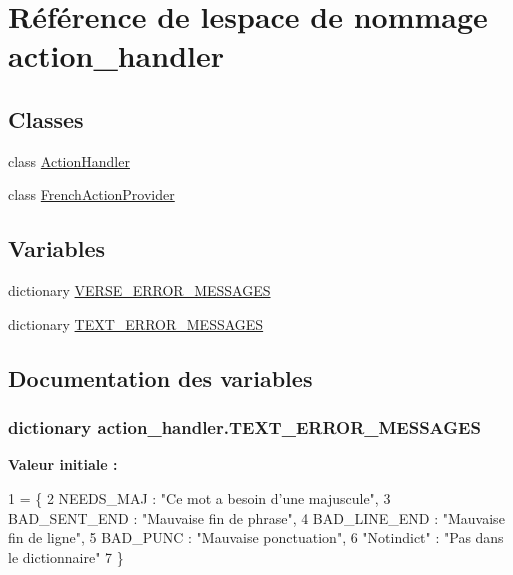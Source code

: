 \hypertarget{namespaceaction__handler}{}\section{Référence de l\textquotesingle{}espace de nommage action\+\_\+handler}
\label{namespaceaction__handler}
\subsection*{Classes}
\begin{DoxyCompactItemize}
\item 
class \hyperlink{classaction__handler_1_1_action_handler}{Action\+Handler}
\item 
class \hyperlink{classaction__handler_1_1_french_action_provider}{French\+Action\+Provider}
\end{DoxyCompactItemize}
\subsection*{Variables}
\begin{DoxyCompactItemize}
\item 
dictionary \hyperlink{namespaceaction__handler_a2d1bf0337f04682fe9609ea8e8b17062}{V\+E\+R\+S\+E\+\_\+\+E\+R\+R\+O\+R\+\_\+\+M\+E\+S\+S\+A\+G\+E\+S}
\item 
dictionary \hyperlink{namespaceaction__handler_a0c839fc6ae4ce8a543497b06da5cd953}{T\+E\+X\+T\+\_\+\+E\+R\+R\+O\+R\+\_\+\+M\+E\+S\+S\+A\+G\+E\+S}
\end{DoxyCompactItemize}


\subsection{Documentation des variables}
\hypertarget{namespaceaction__handler_a0c839fc6ae4ce8a543497b06da5cd953}{}
\subsubsection[{T\+E\+X\+T\+\_\+\+E\+R\+R\+O\+R\+\_\+\+M\+E\+S\+S\+A\+G\+E\+S}]{\setlength{\rightskip}{0pt plus 5cm}dictionary action\+\_\+handler.\+T\+E\+X\+T\+\_\+\+E\+R\+R\+O\+R\+\_\+\+M\+E\+S\+S\+A\+G\+E\+S}\label{namespaceaction__handler_a0c839fc6ae4ce8a543497b06da5cd953}
{\bfseries Valeur initiale \+:}
\begin{DoxyCode}
1 = \{
2 NEEDS\_MAJ : \textcolor{stringliteral}{"Ce mot a besoin d'une majuscule"},
3 BAD\_SENT\_END : \textcolor{stringliteral}{"Mauvaise fin de phrase"},
4 BAD\_LINE\_END : \textcolor{stringliteral}{"Mauvaise fin de ligne"},
5 BAD\_PUNC : \textcolor{stringliteral}{"Mauvaise ponctuation"},
6 \textcolor{stringliteral}{"Notindict"} : \textcolor{stringliteral}{"Pas dans le dictionnaire"}
7 \}
\end{DoxyCode}


